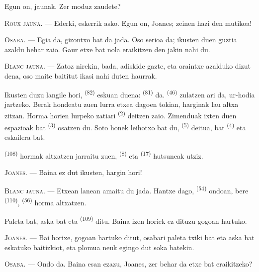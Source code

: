 Egun on, jaunak. Zer moduz zaudete?

\textsc{Roux jauna}. --- Ederki, eskerrik asko. Egun on, Joanes; zeinen hazi den
mutikoa!

\textsc{Osaba}. --- Egia da, gizontxo bat da jada. Oso serioa da; ikusten duen
guztia azaldu behar zaio. Gaur etxe bat nola eraikitzen den jakin nahi du.

\VUsaut{3.0mm}

\textsc{Blanc jauna}. --- Zatoz nirekin, bada, adiskide gazte, eta oraintxe
azalduko dizut dena, oso maite baititut ikasi nahi duten haurrak.

Ikusten duzu langile hori,  \textsuperscript{(82)} eskuan duena:
 \textsuperscript{(81)} da. 
\textsuperscript{(46)} zulatzen ari da, ur-hodia jartzeko. Berak hondeatu zuen
lurra etxea dagoen tokian, harginak lau  altxa zitzan. Horma horien
lurpeko zatiari  \textsuperscript{(2)} deitzen zaio. Zimenduak
ixten duen espazioak  bat \textsuperscript{(3)} osatzen du. Soto
honek leihotxo bat du,  \textsuperscript{(5)} deitua,
 bat \textsuperscript{(4)} eta eskailera bat.

 \textsuperscript{(108)} hormak altxatzen jarraitu zuen,
 \textsuperscript{(8)} eta 
\textsuperscript{(17)} hutsuneak utziz.

\textsc{Joanes}. --- Baina ez dut ikusten, hargin hori!

\textsc{Blanc jauna}. --- Etxean lanean amaitu du jada. Hantxe dago,
 \textsuperscript{(54)} ondoan, bere 
\textsuperscript{(110)},  \textsuperscript{(56)} horma
altxatzen.

Paleta bat, aska bat eta  \textsuperscript{(109)} ditu. Baina izen
horiek ez dituzu gogoan hartuko.

\textsc{Joanes}. --- Bai horixe, gogoan hartuko ditut, osabari paleta txiki bat
eta aska bat eskatuko baitizkiot, eta plomua neuk egingo dut soka batekin.

\VUsaut{3.0mm}
\VUsaut{3.0mm}

\textsc{Osaba}. --- Ondo da. Baina esan ezazu, Joanes, zer behar da etxe bat
eraikitzeko?

